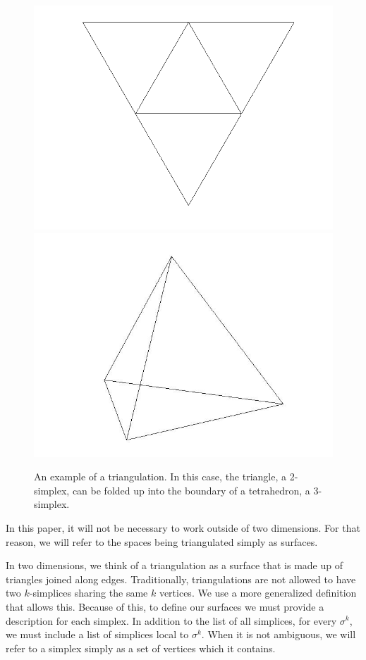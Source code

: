 \documentclass[12pt]{article}
\begin{document}
\begin{figure}
\includegraphics[scale = 0.5]{Pictures3/flattetrahedron.png}
\includegraphics[scale = 0.3]{Pictures3/tetrahedron.jpg}
\caption{An example of a triangulation. In this case, the triangle, a 2-simplex, can be folded up into the boundary of a tetrahedron, a 3-simplex.}
\end{figure}

In this paper, it will not be necessary to work outside of two dimensions. For that reason, we will refer to the spaces being triangulated simply as surfaces.

 In two dimensions, we think of a triangulation as a surface that is made up of triangles joined along edges. Traditionally, triangulations are not allowed to have two $k$-simplices sharing the same $k$ vertices. We use a more generalized definition that allows this. Because of this, to define our surfaces we must provide a description for each simplex. In addition to the list of all simplices, for every $\sigma^k$, we must include a list of simplices local to $\sigma^k$. When it is not ambiguous, we will refer to a simplex simply as a set of vertices which it contains.
 
\end{document}
